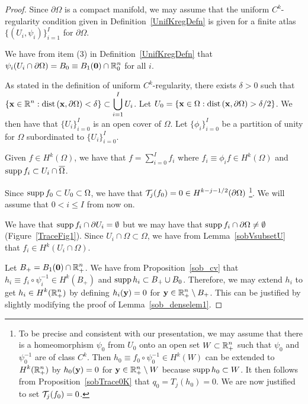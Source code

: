 \begin{proof}
Since $\partial \Omega$ is a compact manifold, we may assume that
the uniform $\displaystyle C^k$-regularity condition given in
Definition~\ref{UnifKregDefn} is given for a finite atlas
$\displaystyle \{ (U_i,\psi_i) \}_{i=1}^I$ for $\partial \Omega$.

We have from item (3) in Definition~\ref{UnifKregDefn} that
$\displaystyle \psi_i(U_i \cap \partial \Omega)
= B_0 \equiv B_1(\mathbf{0}) \cap \mathbb{R}^n_0$ for all $i$.

As stated in the definition of uniform $C^k$-regularity, there exists
$\delta>0$ such that\\
$\displaystyle \left\{ \mathbf{x} \in \mathbb{R}^n :
\mathrm{dist}\left(\mathbf{x},\partial \Omega\right)  < \delta \right\} \subset
\bigcup_{i=1}^I U_i$.
Let $\displaystyle U_0 = \left\{ \mathbf{x} \in \Omega :
\mathrm{dist}\left(\mathbf{x},\partial \Omega\right)  > \delta/2 \right\}$.
We then have that $\displaystyle \{ U_i \}_{i=0}^I$ is an open cover of
$\Omega$.
Let $\displaystyle \{ \phi_i \}_{i=0}^I$ be a partition of unity for
$\Omega$ subordinated to $\displaystyle \{ U_i \}_{i=0}^I$.

Given $\displaystyle f \in H^k(\Omega)$, we have that
$\displaystyle f = \sum_{i=0}^I f_i$ where
$\displaystyle f_i \equiv \phi_i f \in H^k(\Omega)$ and
$\operatorname{supp} f_i \subset U_i \cap \overline{\Omega}$.

Since $\operatorname{supp} f_0 \subset U_0 \subset \Omega$, we have that
$\displaystyle \mathcal{T}_j(f_0) = 0 \in H^{k-j-1/2}(\partial \Omega)$
\footnote{To be precise and consistent with our presentation, we may
assume that there is a homeomorphism $\psi_0$ from $U_0$ onto an open
set $\displaystyle W \subset \mathbb{R}^n_+$ such that $\psi_0$ and
$\psi_0^{-1}$ are of class $\displaystyle C^k$.  Then
$\displaystyle h_0 \equiv f_0 \circ \psi_0^{-1} \in H^k(W)$
can be extended to $\displaystyle H^k(\mathbb{R}_+^n)$ by
$h_0(\mathbf{y}) = 0$ for $\mathbf{y} \in \mathbb{R}_+^n \setminus W$
because $\displaystyle \operatorname{supp} h_0 \subset W$.
It then follows from Proposition~\ref{sobTrace0K} that $q_0 = T_j(h_0) = 0$.
We are now justified to set $\mathcal{T}_j(f_0) = 0$.}.
We will assume that $0<i\leq I$ from now on.

We have that $\operatorname{supp} f_i \cap \partial U_i = \emptyset$ but we may have that
$\operatorname{supp} f_i \cap \partial \Omega \neq \emptyset$ (Figure~\ref{TraceFig1}).
Since $U_i \cap \Omega \subset \Omega$, we have from
Lemma~\ref{sobVsubsetU} that $\displaystyle f_i \in H^k(U_i \cap \Omega)$.

Let $\displaystyle B_+ = B_1(\mathbf{0}) \cap \mathbb{R}^n_+$.
We have from Proposition~\ref{sob_cv} that
$\displaystyle h_i \equiv f_i \circ \psi_i^{-1} \in H^k(B_+)$ and
$\displaystyle \operatorname{supp} h_i \subset B_+ \cup B_0$.  Therefore, we may
extend $h_i$ to get $\displaystyle h_i \in H^k(\mathbb{R}^n_+)$ by defining
$h_i(\mathbf{y}) = 0$ for $\displaystyle \mathbf{y} \in \mathbb{R}^n_+ \setminus B_+$.
This can be justified by slightly modifying the proof of
Lemma~\ref{sob_denselem1}.


\end{proof}
